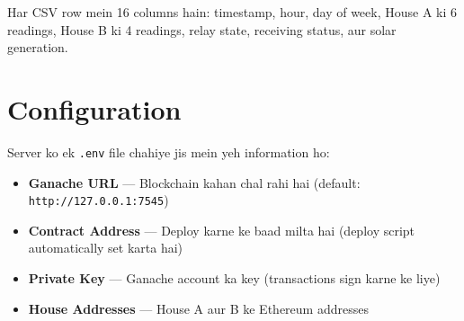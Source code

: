 Har CSV row mein 16 columns hain: timestamp, hour, day of week, House A ki 6 readings, House B ki 4 readings, relay state, receiving status, aur solar generation.

\section{Configuration}

Server ko ek \texttt{.env} file chahiye jis mein yeh information ho:

\begin{itemize}[nosep]
    \item \textbf{Ganache URL} --- Blockchain kahan chal rahi hai (default: \texttt{http://127.0.0.1:7545})
    \item \textbf{Contract Address} --- Deploy karne ke baad milta hai (deploy script automatically set karta hai)
    \item \textbf{Private Key} --- Ganache account ka key (transactions sign karne ke liye)
    \item \textbf{House Addresses} --- House A aur B ke Ethereum addresses
\end{itemize}
